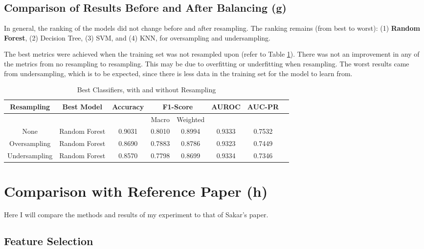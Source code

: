 \documentclass{article}
\begin{document}
\subsection{Comparison of Results Before and After Balancing (g)}

In general, the ranking of the models did not change before and after resampling. The ranking remains (from best to worst): (1) \textbf{Random Forest}, (2) Decision Tree, (3) SVM, and (4) KNN, for oversampling and undersampling.

The best metrics were achieved when the training set was not resampled upon (refer to Table \ref{table:bestModels}). There was not an improvement in any of the metrics from no resampling to resampling. This may be due to overfitting or underfitting when resampling. The worst results came from undersampling, which is to be expected, since there is less data in the training set for the model to learn from.

\begin{table}[H]
\centering
\begin{tabular}{| c || c || c | c | c | c | c | c |} 
\hline
 Resampling & Best Model & Accuracy & \multicolumn{2}{|c|}{F1-Score}  & AUROC & AUC-PR \\ \hline
  & & & Macro & Weighted  & & \\
\hline\hline
None &  Random Forest & \cellcolor{green!25}0.9031 & \cellcolor{green!25}0.8010 & \cellcolor{green!25}0.8994 & \cellcolor{green!25}0.9333 & \cellcolor{green!25}0.7532  \\ \hline 
Oversampling &  Random Forest & 0.8690 & 0.7883 & 0.8786 & 0.9323 & 0.7449 \\ \hline 
Undersampling &  Random Forest & 0.8570 & 0.7798 & 0.8699 & 0.9334 & 0.7346 \\ \hline 
\end{tabular}
\caption{Best Classifiers, with and without Resampling}
\label{table:bestModels}
\end{table}

\section{Comparison with Reference Paper (h)}

Here I will compare the methods and results of my experiment to that of Sakar's paper\cite{sakar_polat_katircioglu_kastro_2018}.

\subsection{Feature Selection}
\end{document}
